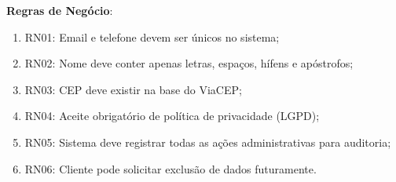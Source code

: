 \begin{itemize}[topsep=1pt, itemsep=0pt]
  \textbf{Regras de Negócio}:
  \begin{enumerate}
    \item RN01: Email e telefone devem ser únicos no sistema;
    \item RN02: Nome deve conter apenas letras, espaços, hífens e apóstrofos;
    \item RN03: CEP deve existir na base do ViaCEP;
    \item RN04: Aceite obrigatório de política de privacidade (LGPD);
    \item RN05: Sistema deve registrar todas as ações administrativas para auditoria;
    \item RN06: Cliente pode solicitar exclusão de dados futuramente.
  \end{enumerate}
\end{itemize}
